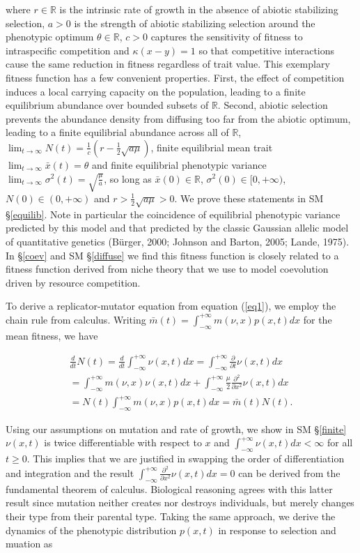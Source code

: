 \documentclass[]{elsarticle} %
\begin{document}
where \(r\in\mathbb{R}\) is the intrinsic rate of growth in the absence
of abiotic stabilizing selection, \(a>0\) is the strength of abiotic
stabilizing selection around the phenotypic optimum
\(\theta\in\mathbb{R}\), \(c>0\) captures the sensitivity of fitness to
intraspecific competition and \(\kappa(x-y)=1\) so that competitive
interactions cause the same reduction in fitness regardless of trait
value. This exemplary fitness function has a few convenient properties.
First, the effect of competition induces a local carrying capacity on
the population, leading to a finite equilibrium abundance over bounded
subsets of \(\mathbb{R}\). Second, abiotic selection prevents the
abundance density from diffusing too far from the abiotic optimum,
leading to a finite equilibrial abundance across all of \(\mathbb{R}\),
\(\lim_{t\to\infty}N(t)=\tfrac{1}{c}(r-\tfrac{1}{2}\sqrt{a\mu})\),
finite equilibrial mean trait \(\lim_{t\to\infty}\bar x(t)=\theta\) and
finite equilibrial phenotypic variance
\(\lim_{t\to\infty}\sigma^2(t)=\sqrt{\frac{\mu}{a}}\), so long as
\(\bar x(0)\in\mathbb{R}\), \(\sigma^2(0)\in[0,+\infty)\),
\(N(0)\in(0,+\infty)\) and \(r>\frac{1}{2}\sqrt{a\mu}>0\). We prove
these statements in SM \S\ref{equilib}. Note in particular the
coincidence of equilibrial phenotypic variance predicted by this model
and that predicted by the classic Gaussian allelic model of quantitative
genetics (Bürger, 2000; Johnson and Barton, 2005; Lande, 1975). In
\S\ref{coev} and SM \S\ref{diffuse} we find this fitness function is
closely related to a fitness function derived from niche theory that we
use to model coevolution driven by resource competition.

To derive a replicator-mutator equation from equation (\ref{eq1}), we
employ the chain rule from calculus. Writing
\(\bar m(t)=\int_{-\infty}^{+\infty}m(\nu,x)p(x,t)dx\) for the mean
fitness, we have

\begin{multline}\label{N_det}
\frac{d}{dt}N(t)=\frac{d}{dt}\int_{-\infty}^{+\infty}\nu(x,t)dx=\int_{-\infty}^{+\infty}\frac{\partial}{\partial t}\nu(x,t)dx \\
=\int_{-\infty}^{+\infty} m(\nu,x)\nu(x,t)dx+\int_{-\infty}^{+\infty}\frac{\mu}{2}\frac{\partial^2}{\partial x^2}\nu(x,t)dx \\
=N(t)\int_{-\infty}^{+\infty} m(\nu,x)p(x,t)dx=\bar m(t) N(t).
\end{multline}

Using our assumptions on mutation and rate of growth, we show in SM
\S\ref{finite} \(\nu(x,t)\) is twice differentiable with respect to
\(x\) and \(\int_{-\infty}^{+\infty}\nu(x,t)dx<\infty\) for all
\(t\geq0\). This implies that we are justified in swapping the order of
differentiation and integration and the result
\(\int_{-\infty}^{+\infty}\frac{\partial^2}{\partial x^2}\nu(x,t)dx=0\)
can be derived from the fundamental theorem of calculus. Biological
reasoning agrees with this latter result since mutation neither creates
nor destroys individuals, but merely changes their type from their
parental type. Taking the same approach, we derive the dynamics of the
phenotypic distribution \(p(x,t)\) in response to selection and muation
as
\end{document}
